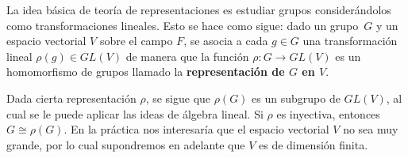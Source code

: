 \documentclass[12pt]{book}
\theoremstyle{definition}
\newcounter{in}
\newcounter{ini}
\begin{document}
La idea básica de teoría de representaciones es estudiar grupos considerándolos como
transformaciones lineales. Esto se hace como sigue: dado un grupo~$G$
y un espacio vectorial $V$ sobre el campo $F$,
se asocia a cada $g\in G$ una transformación lineal $\rho(g)\in GL(V)$
de manera que la función $\rho:G\rightarrow GL(V)$ es un homomorfismo
de grupos llamado la \textbf{representación de $G$ en $V$}. 

Dada cierta representación $\rho$, se sigue que $\rho(G)$ es un
subgrupo de $GL(V)$, al cual se le puede aplicar las ideas de álgebra
lineal. Si $\rho$ es inyectiva, entonces $G\cong \rho(G)$.
En la práctica nos interesaría que el espacio vectorial $V$ no sea muy
grande, por lo cual supondremos en adelante que $V$ es de dimensión
finita. 




\end{document}
